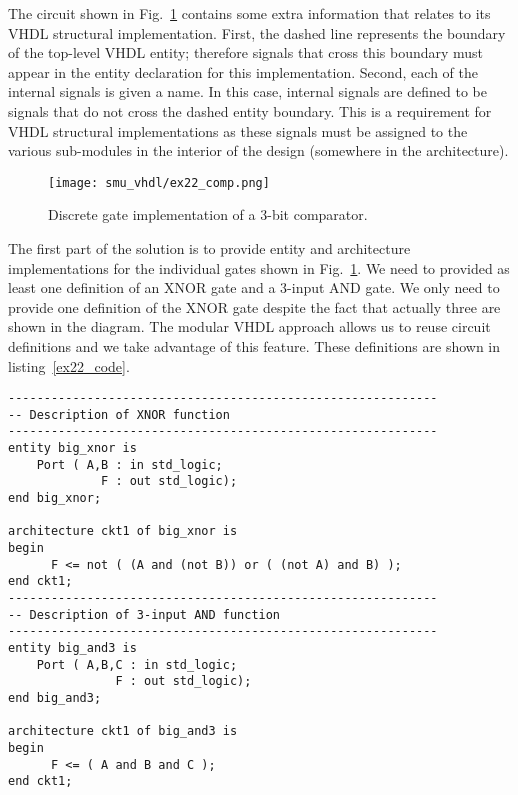 The circuit shown in Fig.~\ref{ex22_comp} contains some extra information that relates to its VHDL structural implementation. First, the dashed line represents the boundary of the top-level VHDL entity; therefore signals that cross this boundary must appear in the entity declaration for this implementation. Second, each of the internal signals is given a name. In this case, internal signals are defined to be signals that do not cross the dashed entity boundary. This is a requirement for VHDL structural implementations as these signals must be assigned to the various sub-modules in the interior of the design (somewhere in the architecture). 

\begin{figure}[!h]
    \centering
	\texttt{[image: smu\_vhdl/ex22\_comp.png]}
	\caption{Discrete gate implementation of a 3-bit comparator.}
	\label{ex22_comp}
\end{figure}

The first part of the solution is to provide entity and architecture implementations for the individual gates shown in Fig.~\ref{ex22_comp}. We need to provided as least one definition of an XNOR gate and a 3-input AND gate. We only need to provide one definition of the XNOR gate despite the fact that actually three are shown in the diagram. The modular VHDL approach allows us to reuse circuit definitions and we take advantage of this feature. These definitions are shown in listing~\ref{ex22_code}. 

\begin{lstlisting}[label=ex22_code, caption=Entity and Architecture definitions for discrete gates.]
------------------------------------------------------------
-- Description of XNOR function
------------------------------------------------------------
entity big_xnor is
    Port ( A,B : in std_logic;
             F : out std_logic);
end big_xnor;

architecture ckt1 of big_xnor is
begin
      F <= not ( (A and (not B)) or ( (not A) and B) ); 
end ckt1;   
------------------------------------------------------------
-- Description of 3-input AND function
------------------------------------------------------------
entity big_and3 is
    Port ( A,B,C : in std_logic;
               F : out std_logic);
end big_and3;

architecture ckt1 of big_and3 is
begin
      F <= ( A and B and C ); 
end ckt1;
\end{lstlisting}

